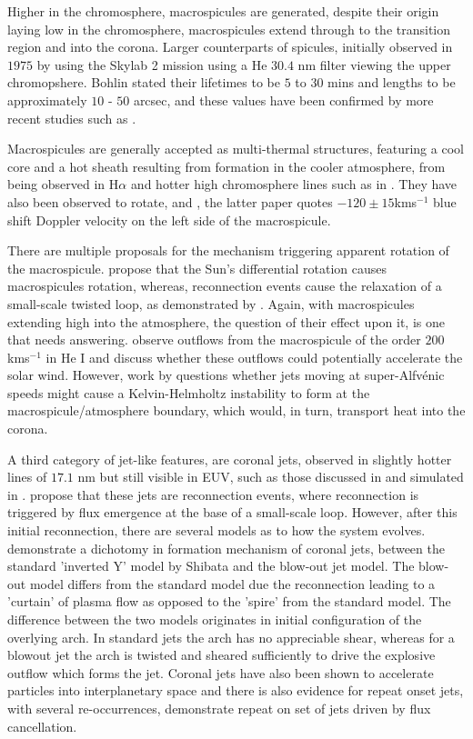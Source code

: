 \documentclass{emulateapj}
\begin{document}
Higher in the chromosphere, macrospicules are generated, despite their origin laying low in the chromosphere, macrospicules extend through to the transition region and into the corona. 
Larger counterparts of spicules, initially observed in $1975$ by \cite{Bohlin1975} using the Skylab 2 mission using a He $30.4$ nm filter viewing the upper chromopshere.
Bohlin stated their lifetimes to be $5$ to $30$ mins and lengths to be approximately $10$ - $50$ arcsec, and these values have been confirmed by more recent studies such as \cite{Bennett2015}.

Macrospicules are generally accepted as multi-thermal structures, featuring a cool core and a hot sheath resulting from formation in the cooler atmosphere, from being observed in H$\alpha$ \citep{LaBonte79} and hotter high chromosphere lines such as in \cite{Parenti2002}.
They have also been observed to rotate, \cite{Pike_Mason1998} and \cite{Kamio2010}, the latter paper quotes $-120 \pm 15$kms$^{-1}$ blue shift Doppler velocity on the left side of the macrospicule. 

There are multiple proposals for the mechanism triggering apparent rotation of the macrospicule. 
\cite{Curdt2011} propose that the Sun's differential rotation causes macrospicules rotation, whereas, reconnection events cause the relaxation of a small-scale twisted loop, as demonstrated by \cite{Adams2014}.
Again, with macrospicules extending high into the atmosphere, the question of their effect upon it, is one that needs answering.
\cite{Pike_Harrison1997} observe outflows from the macrospicule of the order $200$ kms$^{-1}$ in He I and discuss whether these outflows could potentially accelerate the solar wind.
However, work by \cite{Zaqarashvili2014} questions whether jets moving at super-Alfv{\'e}nic speeds might cause a Kelvin-Helmholtz instability to form at the macrospicule/atmosphere boundary, which would, in turn, transport heat into the corona.

A third category of jet-like features, are coronal jets, observed in slightly hotter lines of $17.1$ nm but still visible in EUV, such as those discussed in \cite{Shibata1992} and simulated in \cite{Wyper2016}.
\cite{Shibata1994} propose that these jets are reconnection events, where reconnection is triggered by flux emergence at the base of a small-scale loop.
However, after this initial reconnection, there are several models as to how the system evolves.
\cite{Moore2010} demonstrate a dichotomy in formation mechanism of coronal jets, between the standard 'inverted Y' model by Shibata and the blow-out jet model. 
The blow-out model differs from the standard model due the reconnection leading to a 'curtain' of plasma flow as opposed to the 'spire' from the standard model.
The difference between the two models originates in initial configuration of the overlying arch. 
In standard jets the arch has no appreciable shear, whereas for a blowout jet the arch is twisted and sheared sufficiently to drive the explosive outflow which forms the jet.
Coronal jets have also been shown to accelerate particles into interplanetary space \citep{Li2011} and there is also evidence for repeat onset jets, with several re-occurrences, \cite{Chifor2008} demonstrate repeat on set of jets driven by flux cancellation.
\end{document}
